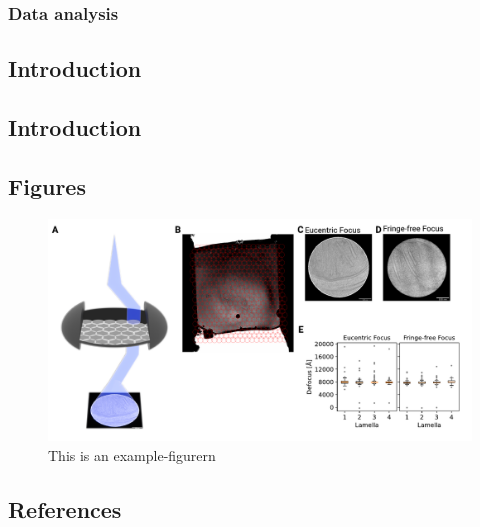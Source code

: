 \documentclass[
]{article}
\makeatletter
\newcounter{figno}
\newenvironment{fignos:no-prefix-figure-caption}{
  \caption@ifcompatibility{}{
    \let\oldthefigure\thefigure
    \let\oldtheHfigure\theHfigure
    \renewcommand{\thefigure}{figno:\thefigno}
    \renewcommand{\theHfigure}{figno:\thefigno}
    \stepcounter{figno}
    \captionsetup{labelformat=empty}
  }
}{
  \caption@ifcompatibility{}{
    \captionsetup{labelformat=default}
    \let\thefigure\oldthefigure
    \let\theHfigure\oldtheHfigure
    \addtocounter{figure}{-1}
  }
}
\makeatother
\begin{document}
\hypertarget{data-analysis}{%
\subsubsection{Data analysis}\label{data-analysis}}

\hypertarget{introduction-1}{%
\subsection{Introduction}\label{introduction-1}}

\hypertarget{introduction-2}{%
\subsection{Introduction}\label{introduction-2}}

\hypertarget{figures}{%
\subsection{Figures}\label{figures}}

\begin{fignos:no-prefix-figure-caption}

\begin{figure}
\centering
\includegraphics{figures/example-figure.pdf}
\caption{This is an example-figurern}
\end{figure}

\end{fignos:no-prefix-figure-caption}

\hypertarget{references}{%
\subsection{References}\label{references}}
\end{document}
